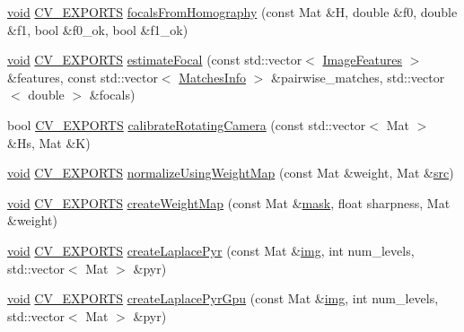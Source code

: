 \begin{DoxyCompactItemize}
\item 
\hyperlink{legacy_8hpp_a8bb47f092d473522721002c86c13b94e}{void} \hyperlink{core_2types__c_8h_a1bf9f0e121b54272da02379cfccd0a2b}{C\-V\-\_\-\-E\-X\-P\-O\-R\-T\-S} \hyperlink{namespacecv_1_1detail_aa90289b18b321e268ea0049cd693633c}{focals\-From\-Homography} (const Mat \&H, double \&f0, double \&f1, bool \&f0\-\_\-ok, bool \&f1\-\_\-ok)
\item 
\hyperlink{legacy_8hpp_a8bb47f092d473522721002c86c13b94e}{void} \hyperlink{core_2types__c_8h_a1bf9f0e121b54272da02379cfccd0a2b}{C\-V\-\_\-\-E\-X\-P\-O\-R\-T\-S} \hyperlink{namespacecv_1_1detail_a36c44fb204f5f0ae2b87274173a0cee2}{estimate\-Focal} (const std\-::vector$<$ \hyperlink{structcv_1_1detail_1_1ImageFeatures}{Image\-Features} $>$ \&features, const std\-::vector$<$ \hyperlink{structcv_1_1detail_1_1MatchesInfo}{Matches\-Info} $>$ \&pairwise\-\_\-matches, std\-::vector$<$ double $>$ \&focals)
\item 
bool \hyperlink{core_2types__c_8h_a1bf9f0e121b54272da02379cfccd0a2b}{C\-V\-\_\-\-E\-X\-P\-O\-R\-T\-S} \hyperlink{namespacecv_1_1detail_a625c378a256f7f26b309ba6035b4bd80}{calibrate\-Rotating\-Camera} (const std\-::vector$<$ Mat $>$ \&Hs, Mat \&K)
\item 
\hyperlink{legacy_8hpp_a8bb47f092d473522721002c86c13b94e}{void} \hyperlink{core_2types__c_8h_a1bf9f0e121b54272da02379cfccd0a2b}{C\-V\-\_\-\-E\-X\-P\-O\-R\-T\-S} \hyperlink{namespacecv_1_1detail_ac8b136985c82aa1f238624bd219cb25d}{normalize\-Using\-Weight\-Map} (const Mat \&weight, Mat \&\hyperlink{legacy_8hpp_a371cd109b74033bc4366f584edd3dacc}{src})
\item 
\hyperlink{legacy_8hpp_a8bb47f092d473522721002c86c13b94e}{void} \hyperlink{core_2types__c_8h_a1bf9f0e121b54272da02379cfccd0a2b}{C\-V\-\_\-\-E\-X\-P\-O\-R\-T\-S} \hyperlink{namespacecv_1_1detail_a14438b417b9a4a5d34d32e86815ca21d}{create\-Weight\-Map} (const Mat \&\hyperlink{tracking_8hpp_a6b13ecd2fd6ec7ad422f1d7863c3ad19}{mask}, float sharpness, Mat \&weight)
\item 
\hyperlink{legacy_8hpp_a8bb47f092d473522721002c86c13b94e}{void} \hyperlink{core_2types__c_8h_a1bf9f0e121b54272da02379cfccd0a2b}{C\-V\-\_\-\-E\-X\-P\-O\-R\-T\-S} \hyperlink{namespacecv_1_1detail_a7153be56973e1dafb76de2614c7c9dfe}{create\-Laplace\-Pyr} (const Mat \&\hyperlink{legacy_8hpp_a5349238b3772bed6eae0fda3117ccfef}{img}, int num\-\_\-levels, std\-::vector$<$ Mat $>$ \&pyr)
\item 
\hyperlink{legacy_8hpp_a8bb47f092d473522721002c86c13b94e}{void} \hyperlink{core_2types__c_8h_a1bf9f0e121b54272da02379cfccd0a2b}{C\-V\-\_\-\-E\-X\-P\-O\-R\-T\-S} \hyperlink{namespacecv_1_1detail_a675c009493097bb26444925de90953a9}{create\-Laplace\-Pyr\-Gpu} (const Mat \&\hyperlink{legacy_8hpp_a5349238b3772bed6eae0fda3117ccfef}{img}, int num\-\_\-levels, std\-::vector$<$ Mat $>$ \&pyr)

\end{DoxyCompactItemize}
